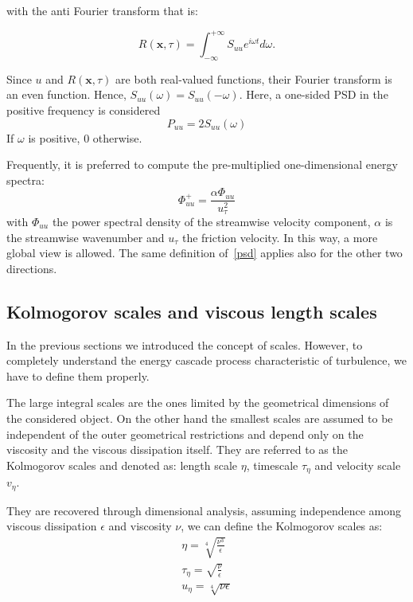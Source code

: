 with the anti Fourier transform that is:

\begin{equation*}
R(\mathbf{x},\tau) = \int_{-\infty}^{+\infty} S_{uu} e^{i\omega t} d \omega.
\end{equation*}
\par
Since $u$ and $R(\mathbf{x},\tau)$ are both real-valued functions, their Fourier transform is an even function. Hence, $S_{uu}(\omega) = S_{uu}(-\omega)$. Here, a one-sided PSD in the positive frequency is considered
\begin{equation*}
P_{uu} = 2 S_{uu}(\omega)
\end{equation*}
If $\omega$ is positive, 0 otherwise.
\par
Frequently, it is preferred to compute the pre-multiplied one-dimensional energy spectra:
\begin{equation}
\Phi_{uu}^{+} = \frac{\alpha \Phi_{uu}}{u_{\tau}^{2}}
\label{psd}
\end{equation}
with $\Phi_{uu}$ the power spectral density of the streamwise velocity component, $\alpha$ is the streamwise wavenumber and $u_{\tau}$ the friction velocity. In this way, a more global view is allowed.
The same definition of~\ref{psd} applies also for the other two directions.




\subsection{Kolmogorov scales and viscous length scales}
In the previous sections we introduced the concept of scales. However, to completely understand the energy cascade process characteristic of turbulence, we have to define them properly.
\par
The large integral scales are the ones limited by the geometrical dimensions of the considered object. On the other hand the smallest scales are assumed to be independent of the outer geometrical restrictions and depend only on the viscosity and the viscous dissipation itself. They are referred to as the Kolmogorov scales and denoted as: length scale $\eta$, timescale $\tau_{\eta}$ and velocity scale $v_{\eta}$. 
\par
They are recovered through dimensional analysis, assuming independence among viscous dissipation $\epsilon$ and viscosity $\nu$, we can define the Kolmogorov scales as:
\begin{subequations}
\begin{align}
\eta = \sqrt[4]{ \frac{\nu^{3}}{\epsilon} }\\
\tau_{\eta} =\sqrt{ \frac{\nu}{\epsilon}}\\
u_{\eta} = \sqrt[4]{\nu \epsilon }
\end{align}
\end{subequations}


